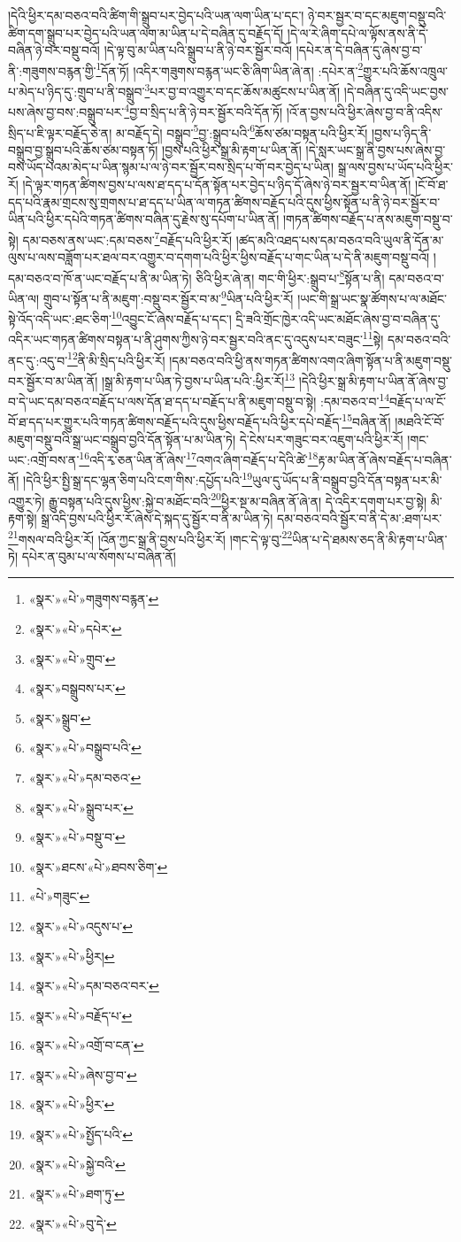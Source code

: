 །དེའི་ཕྱིར་དམ་བཅའ་བའི་ཚིག་གི་སྒྲུབ་པར་བྱེད་པའི་ཡན་ལག་ཡིན་པ་དང་། ཉེ་བར་སྦྱར་བ་དང་མཇུག་བསྡུ་བའི་ཚིག་དག་སྒྲུབ་པར་བྱེད་པའི་ཡན་ལག་མ་ཡིན་པ་དེ་བཞིན་དུ་བརྗོད་དོ། །དེ་ལ་རེ་ཞིག་དཔེ་ལ་ལྟོས་ནས་ནི་དེ་བཞིན་ཉེ་བར་བསྡུ་བའོ། །དེ་ལྟ་བུ་མ་ཡིན་པའི་སྒྲུབ་པ་ནི་ཉེ་བར་སྦྱོར་བའོ། །དཔེར་ན་དེ་བཞིན་དུ་ཞེས་བྱ་བ་ནི་:གཟུགས་བརྙན་གྱི་\footnote{«སྣར་»«པེ་»གཟུགས་བརྙན་}དོན་ཏོ། །འདིར་གཟུགས་བརྙན་ཡང་ཅི་ཞིག་ཡིན་ཞེ་ན། :དཔེར་ན་\footnote{«སྣར་»«པེ་»དཔེར་}གྱུར་པའི་ཆོས་འཁྲུལ་པ་མེད་པ་ཉིད་དུ་:གྲུབ་པ་ནི་བསྒྲུབ་\footnote{«སྣར་»«པེ་»གྲུབ་}པར་བྱ་བ་འགྱུར་བ་དང་ཆོས་མཚུངས་པ་ཡིན་ནོ། །དེ་བཞིན་དུ་འདི་ཡང་བྱས་པས་ཞེས་བྱ་བས་:བསྒྲུབ་པར་\footnote{«སྣར་»བསྒྲུབས་པར་}བྱ་བ་སྲིད་པ་ནི་ཉེ་བར་སྦྱོར་བའི་དོན་ཏོ། །འོ་ན་བྱས་པའི་ཕྱིར་ཞེས་བྱ་བ་ནི་འདིས་སྲིད་པ་ཇི་ལྟར་བརྗོད་ཅེ་ན། མ་བརྗོད་དེ། བསྒྲུབ་\footnote{«སྣར་»སྒྲུབ་}བྱ་:སྒྲུབ་པའི་\footnote{«སྣར་»«པེ་»བསྒྲུབ་པའི་}ཆོས་ཙམ་བསྟན་པའི་ཕྱིར་རོ། །བྱས་པ་ཉིད་ནི་བསྒྲུབ་བྱ་སྒྲུབ་པའི་ཆོས་ཙམ་བསྟན་ཏོ། །བྱས་པའི་ཕྱིར་སྒྲ་མི་རྟག་པ་ཡིན་ནོ། །དེ་སླར་ཡང་སྒྲ་ནི་བྱས་པས་ཞེས་བྱ་བས་ཡོད་པའམ་མེད་པ་ཡིན་སྙམ་པ་ལ་ཉེ་བར་སྦྱོར་བས་སྲིད་པ་གོ་བར་བྱེད་པ་ཡིན། སྒྲ་ལས་བྱས་པ་ཡོད་པའི་ཕྱིར་རོ། །དེ་ལྟར་གཏན་ཚིགས་བྱས་པ་ལས་ཐ་དད་པ་དོན་སྟོན་པར་བྱེད་པ་ཉིད་དོ་ཞེས་ཉེ་བར་སྦྱར་བ་ཡིན་ནོ། །ངོ་བོ་ཐ་དད་པའི་རྣམ་གྲངས་སུ་གྲགས་པ་ཐ་དད་པ་ཡིན་ལ་གཏན་ཚིགས་བརྗོད་པའི་དུས་ཕྱིས་སྟོན་པ་ནི་ཉེ་བར་སྦྱོར་བ་ཡིན་པའི་ཕྱིར་དཔེའི་གཏན་ཚིགས་བཞིན་དུ་རྗེས་སུ་དཔོག་པ་ཡིན་ནོ། །གཏན་ཚིགས་བརྗོད་པ་ནས་མཇུག་བསྡུ་བ་སྟེ། དམ་བཅས་ནས་ཡང་:དམ་བཅས་\footnote{«སྣར་»«པེ་»དམ་བཅའ་}བརྗོད་པའི་ཕྱིར་རོ། །ཚད་མའི་འཐད་པས་དམ་བཅའ་བའི་ཡུལ་ནི་དོན་མ་ལུས་པ་ལས་བཟློག་པར་ཐལ་བར་འགྱུར་བ་དགག་པའི་ཕྱིར་ཕྱིས་བརྗོད་པ་གང་ཡིན་པ་དེ་ནི་མཇུག་བསྡུ་བའོ། །དམ་བཅའ་བ་ཁོ་ན་ཡང་བརྗོད་པ་ནི་མ་ཡིན་ཏེ། ཅིའི་ཕྱིར་ཞེ་ན། གང་གི་ཕྱིར་:སྒྲུབ་པ་\footnote{«སྣར་»«པེ་»སྒྲུབ་པར་}སྟོན་པ་ནི། དམ་བཅའ་བ་ཡིན་ལ། གྲུབ་པ་སྟོན་པ་ནི་མཇུག་:བསྡུ་བར་སྦྱོར་བ་མ་\footnote{«སྣར་»«པེ་»བསྡུ་བ་}ཡིན་པའི་ཕྱིར་རོ། །ཡང་གི་སྒྲ་ཡང་སྣ་ཚོགས་པ་ལ་མཐོང་སྟེ་འོད་འདི་ཡང་:ཐང་ཅིག་\footnote{«སྣར་»ཐངས་«པེ་»ཐབས་ཅིག་}འབྱུང་ངོ་ཞེས་བརྗོད་པ་དང་། དྲི་ཟའི་གྲོང་ཁྱེར་འདི་ཡང་མཐོང་ཞེས་བྱ་བ་བཞིན་དུ་འདིར་ཡང་གཏན་ཚིགས་བསྟན་པ་ནི་ཤུགས་ཀྱིས་ཉེ་བར་སྦྱར་བའི་ནང་དུ་འདུས་པར་བཟུང་\footnote{«པེ་»གཟུང་}སྟེ། དམ་བཅའ་བའི་ནང་དུ་:འདུ་བ་\footnote{«སྣར་»«པེ་»འདུས་པ་}ནི་མི་སྲིད་པའི་ཕྱིར་རོ། །དམ་བཅའ་བའི་ཕྱི་ནས་གཏན་ཚིགས་འགའ་ཞིག་སྟོན་པ་ནི་མཇུག་བསྡུ་བར་སྦྱོར་བ་མ་ཡིན་ནོ། །སྒྲ་མི་རྟག་པ་ཡིན་ཏེ་བྱས་པ་ཡིན་པའི་:ཕྱིར་རོ།\footnote{«སྣར་»«པེ་»ཕྱིར།} །དེའི་ཕྱིར་སྒྲ་མི་རྟག་པ་ཡིན་ནོ་ཞེས་བྱ་བ་དེ་ཡང་དམ་བཅའ་བརྗོད་པ་ལས་དོན་ཐ་དད་པ་བརྗོད་པ་ནི་མཇུག་བསྡུ་བ་སྟེ། :དམ་བཅའ་བ་\footnote{«སྣར་»«པེ་»དམ་བཅའ་བར་}བརྗོད་པ་ལ་ངོ་བོ་ཐ་དད་པར་གྱུར་པའི་གཏན་ཚིགས་བརྗོད་པའི་དུས་ཕྱིས་བརྗོད་པའི་ཕྱིར་དཔེ་བརྗོད་\footnote{«སྣར་»«པེ་»བརྗོད་པ་}བཞིན་ནོ། །མཐའི་ངོ་བོ་མཇུག་བསྡུ་བའི་སྒྲ་ཡང་བསྒྲུབ་བྱའི་དོན་སྟོན་པ་མ་ཡིན་ཏེ། དེ་ངེས་པར་གཟུང་བར་འཇུག་པའི་ཕྱིར་རོ། །གང་ཡང་:འགྲོ་བས་ན་\footnote{«སྣར་»«པེ་»འགྲོ་བ་ངན་}འདི་རྭ་ཅན་ཡིན་ནོ་ཞེས་\footnote{«སྣར་»«པེ་»ཞེས་བྱ་བ་}འགའ་ཞིག་བརྗོད་པ་དེའི་ཚེ་\footnote{«སྣར་»«པེ་»ཕྱིར་}རྟ་མ་ཡིན་ནོ་ཞེས་བརྗོད་པ་བཞིན་ནོ། །དེའི་ཕྱིར་སྤྱི་སྒྲ་དང་ལྷན་ཅིག་པའི་ངག་གིས་:དཔྱོད་པའི་\footnote{«སྣར་»«པེ་»སྤྱོད་པའི་}ཡུལ་དུ་ཡོད་པ་ནི་བསྒྲུབ་བྱའི་དོན་བསྟན་པར་མི་འགྱུར་ཏེ། རྒྱུ་བསྟན་པའི་དུས་ཕྱིས་:སྐྱེ་བ་མཐོང་བའི་\footnote{«སྣར་»«པེ་»སྐྱེ་བའི་}ཕྱིར་སྔ་མ་བཞིན་ནོ་ཞེ་ན། དེ་འདིར་དགག་པར་བྱ་སྟེ། མི་རྟག་སྟེ། སྒྲ་འདི་བྱས་པའི་ཕྱིར་རོ་ཞེས་དེ་སྐད་དུ་སྦྱོར་བ་ནི་མ་ཡིན་ཏེ། དམ་བཅའ་བའི་སྦྱོར་བ་ནི་དེ་མ་:ཐག་པར་\footnote{«སྣར་»«པེ་»ཐག་ཏུ་}གསལ་བའི་ཕྱིར་རོ། །འོན་ཀྱང་སྒྲ་ནི་བྱས་པའི་ཕྱིར་རོ། །གང་དེ་ལྟ་བུ་\footnote{«སྣར་»«པེ་»བུ་དེ་}ཡིན་པ་དེ་ཐམས་ཅད་ནི་མི་རྟག་པ་ཡིན་ཏེ། དཔེར་ན་བུམ་པ་ལ་སོགས་པ་བཞིན་ནོ། 